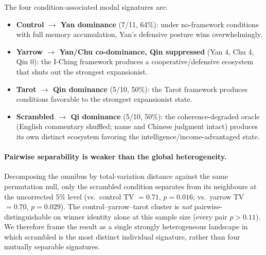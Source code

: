 \documentclass[11pt]{article}
\begin{document}
The four condition-associated modal signatures are:
\begin{itemize}
\item \textbf{Control $\to$ Yan dominance} (7/11, 64\%): under no-framework conditions with full memory accumulation, Yan's defensive posture wins overwhelmingly.
\item \textbf{Yarrow $\to$ Yan/Chu co-dominance, Qin suppressed} (Yan 4, Chu 4, Qin 0): the I-Ching framework produces a cooperative/defensive ecosystem that shuts out the strongest expansionist.
\item \textbf{Tarot $\to$ Qin dominance} (5/10, 50\%): the Tarot framework produces conditions favorable to the strongest expansionist state.
\item \textbf{Scrambled $\to$ Qi dominance} (5/10, 50\%): the coherence-degraded oracle (English commentary shuffled; name and Chinese judgment intact) produces its own distinct ecosystem favoring the intelligence/income-advantaged state.
\end{itemize}

\paragraph{Pairwise separability is weaker than the global heterogeneity.} Decomposing the omnibus by total-variation distance against the same permutation null, only the scrambled condition separates from its neighbours at the uncorrected 5\% level (vs.\ control TV $= 0.71$, $p = 0.016$; vs.\ yarrow TV $= 0.70$, $p = 0.029$). The control--yarrow--tarot cluster is \emph{not} pairwise-distinguishable on winner identity alone at this sample size (every pair $p > 0.11$). We therefore frame the result as a single strongly heterogeneous landscape in which scrambled is the most distinct individual signature, rather than four mutually separable signatures.
\end{document}
